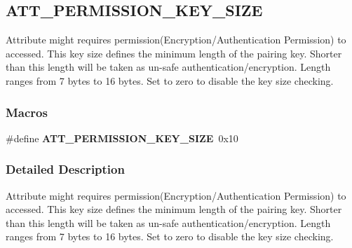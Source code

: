 \hypertarget{group___a_t_t___p_e_r_m_i_s_s_i_o_n___k_e_y___s_i_z_e}{}\subsection{A\+T\+T\+\_\+\+P\+E\+R\+M\+I\+S\+S\+I\+O\+N\+\_\+\+K\+E\+Y\+\_\+\+S\+I\+ZE}
\label{group___a_t_t___p_e_r_m_i_s_s_i_o_n___k_e_y___s_i_z_e}


Attribute might requires permission(Encryption/\+Authentication Permission) to accessed. This key size defines the minimum length of the pairing key. Shorter than this length will be taken as un-\/safe authentication/encryption. Length ranges from 7 bytes to 16 bytes. Set to zero to disable the key size checking.  


\subsubsection*{Macros}
\begin{DoxyCompactItemize}
\item 
\#define {\bfseries A\+T\+T\+\_\+\+P\+E\+R\+M\+I\+S\+S\+I\+O\+N\+\_\+\+K\+E\+Y\+\_\+\+S\+I\+ZE}~0x10\hypertarget{group___a_t_t___p_e_r_m_i_s_s_i_o_n___k_e_y___s_i_z_e_gab7215962faf3a8a677cca4a1d9144d0c}{}\label{group___a_t_t___p_e_r_m_i_s_s_i_o_n___k_e_y___s_i_z_e_gab7215962faf3a8a677cca4a1d9144d0c}

\end{DoxyCompactItemize}


\subsubsection{Detailed Description}
Attribute might requires permission(Encryption/\+Authentication Permission) to accessed. This key size defines the minimum length of the pairing key. Shorter than this length will be taken as un-\/safe authentication/encryption. Length ranges from 7 bytes to 16 bytes. Set to zero to disable the key size checking. 


